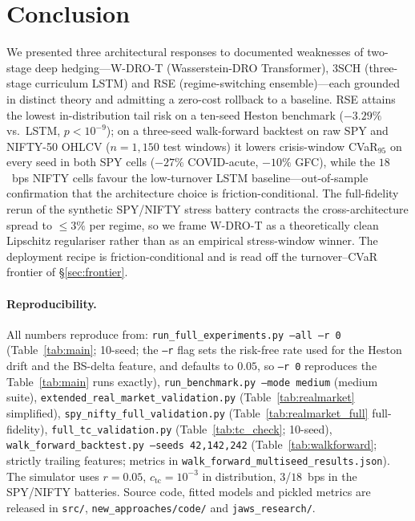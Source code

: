 \documentclass[10pt,letterpaper]{article}
\begin{document}
\section{Conclusion}\label{sec:conclusion}

We presented three architectural responses to documented
weaknesses of two-stage deep hedging---W-DRO-T (Wasserstein-DRO
Transformer), 3SCH (three-stage curriculum LSTM) and RSE
(regime-switching ensemble)---each grounded in distinct theory and
admitting a zero-cost rollback to a baseline. RSE attains the
lowest in-distribution tail risk on a ten-seed Heston benchmark
($-3.29\%$ vs.\ LSTM, $p<10^{-9}$); on a three-seed walk-forward
backtest on raw SPY and NIFTY-50 OHLCV ($n=1{,}150$ test windows)
it lowers crisis-window CVaR$_{95}$ on every seed in both SPY
cells ($-27\%$ COVID-acute, $-10\%$ GFC), while the $18$~bps
NIFTY cells favour the low-turnover LSTM baseline---out-of-sample
confirmation that the architecture choice is
friction-conditional. The full-fidelity rerun of the
synthetic SPY/NIFTY stress battery contracts the
cross-architecture spread to $\le 3\%$ per regime, so we frame
W-DRO-T as a theoretically clean Lipschitz regulariser rather
than as an empirical stress-window winner. The deployment recipe
is friction-conditional and is read off the turnover--CVaR
frontier of \S\ref{sec:frontier}.

\paragraph{Reproducibility.}
All numbers reproduce from:
\texttt{run\_full\_experiments.py --all --r 0} (Table~\ref{tab:main};
10-seed; the \texttt{--r} flag sets the risk-free rate used for the
Heston drift and the BS-delta feature, and defaults to $0.05$, so
\texttt{--r 0} reproduces the Table~\ref{tab:main} runs exactly),
\texttt{run\_benchmark.py --mode medium} (medium suite),
\texttt{extended\_real\_market\_validation.py}
(Table~\ref{tab:realmarket} simplified),
\texttt{spy\_nifty\_full\_validation.py}
(Table~\ref{tab:realmarket_full} full-fidelity),
\texttt{full\_tc\_validation.py} (Table~\ref{tab:tc_check}; 10-seed),
\texttt{walk\_forward\_backtest.py --seeds 42,142,242}
(Table~\ref{tab:walkforward}; strictly trailing features; metrics
in \texttt{walk\_forward\_multiseed\_results.json}).
The simulator uses $r=0.05$, $c_{\mathrm{tc}}\!=\!10^{-3}$ in
distribution, $3$/$18$~bps in the SPY/NIFTY batteries.
Source code, fitted models and pickled metrics are released in
\texttt{src/}, \texttt{new\_approaches/code/} and
\texttt{jaws\_research/}.



\end{document}
